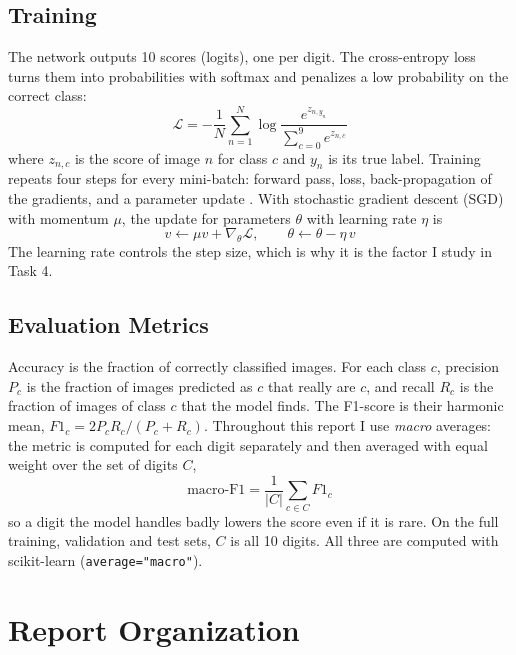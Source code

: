 \subsection{Training}

The network outputs 10 scores (logits), one per digit. The cross-entropy
loss turns them into probabilities with softmax and penalizes a low
probability on the correct class:
\begin{equation}
  \mathcal{L} = -\frac{1}{N} \sum_{n=1}^{N} \log
  \frac{e^{z_{n,y_n}}}{\sum_{c=0}^{9} e^{z_{n,c}}}
  \label{eq:ce}
\end{equation}
where $z_{n,c}$ is the score of image $n$ for class $c$ and $y_n$ is its
true label. Training repeats four steps for every mini-batch: forward
pass, loss, back-propagation of the gradients, and a parameter update
\citep{abidl08}. With stochastic gradient descent (SGD) with momentum
$\mu$, the update for parameters $\theta$ with learning rate $\eta$ is
\begin{equation}
  v \leftarrow \mu v + \nabla_\theta \mathcal{L}, \qquad
  \theta \leftarrow \theta - \eta\, v
  \label{eq:sgd}
\end{equation}
The learning rate controls the step size, which is why it is the factor
I study in Task 4.

\subsection{Evaluation Metrics}

Accuracy is the fraction of correctly classified images. For each class
$c$, precision $P_c$ is the fraction of images predicted as $c$ that
really are $c$, and recall $R_c$ is the fraction of images of class $c$
that the model finds. The F1-score is their harmonic mean,
$F1_c = 2 P_c R_c / (P_c + R_c)$. Throughout this report I use
\emph{macro} averages: the metric is computed for each digit separately
and then averaged with equal weight over the set of digits $C$,
\begin{equation}
  \text{macro-F1} = \frac{1}{|C|} \sum_{c \in C} F1_c
  \label{eq:macrof1}
\end{equation}
so a digit the model handles badly lowers the score even if it is rare.
On the full training, validation and test sets, $C$ is all 10 digits.
All three are computed with scikit-learn \citep{pedregosa2011}
(\texttt{average="macro"}).


\section{Report Organization}
\label{sec:organization}

